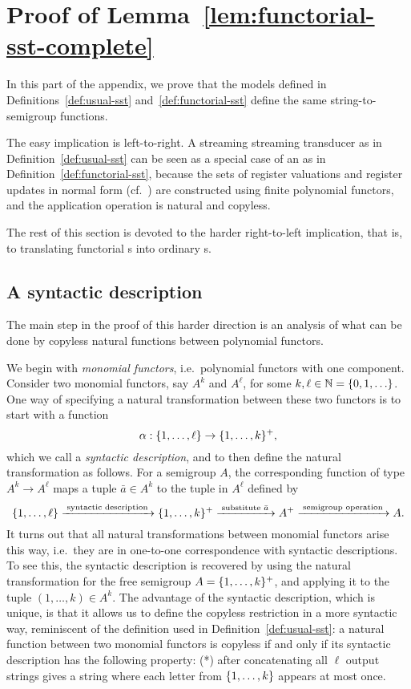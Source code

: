 \section{Proof of Lemma~\ref{lem:functorial-sst-complete}}
In this part of the appendix, we prove that the models defined in Definitions~\ref{def:usual-sst} and~\ref{def:functorial-sst} define the same string-to-semigroup functions.

The easy implication is left-to-right. 
    A streaming streaming transducer as in Definition~\ref{def:usual-sst} can be seen as a special case of an \sst as in Definition~\ref{def:functorial-sst}, because the sets of register valuations and register updates in normal form (cf.~) are constructed using finite polynomial functors, and the application operation is natural and copyless. 

The rest of this section is devoted to the harder right-to-left implication, that is, to translating functorial \sst{}s into ordinary \sst{}s.

\subsection{A syntactic description}

The main step in the proof of this harder direction is an analysis of what can be done by copyless natural functions between polynomial functors.

We begin with \emph{monomial functors}, i.e.~polynomial functors with one component. 
Consider two monomial functors, say $A^k$ and $A^\ell$, for some  $k,\ell \in \mathbb{N} = \{0,1,\ldots\}$.
One way of specifying a natural transformation between these two functors is to start with a function 
\begin{equation}
\label{eq:syntactic-description}    \alpha : \{1,\ldots,\ell\} \to \{1,\ldots,k\}^+,
\end{equation}
which we call a \emph{syntactic description}, and to then  define the  natural transformation as follows. For a semigroup $A$, the corresponding function of type $A^k \to A^\ell$  maps a tuple $\bar a \in A^k$ to the tuple in $A^\ell$ defined by
\[
\{1,\ldots,\ell\}
\xrightarrow{\;\text{syntactic description}\;}
\{1,\ldots,k\}^+ 
\xrightarrow{\;\text{substitute $\bar a$}\;}
A^+
\xrightarrow{\;\text{semigroup operation}\;}
A.
\]
It turns out that all  natural transformations between monomial functors arise this way, i.e.~they are in one-to-one correspondence with syntactic descriptions. To see this, the syntactic description is recovered by using the natural transformation for the free semigroup $A=\{1,\ldots,k\}^+$, and applying it to the tuple $(1,\ldots,k) \in A^k$.
The advantage of the syntactic description, which is unique, is that it allows us to define the  {copyless restriction} in a more syntactic way, reminiscent of the definition used in Definition~\ref{def:usual-sst}:  a natural function between two monomial functors is copyless if and only if its syntactic description has the following property: (*) after concatenating all $\ell$ output strings gives a string where each letter from $\{1,\ldots,k\}$ appears at most once. 

